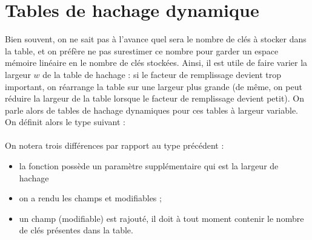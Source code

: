 \documentclass[10pt,a4paper, varwidth]{article}
\begin{document}
	\section{Tables de hachage dynamique}
	
	Bien souvent, on ne sait pas à l'avance quel sera le nombre de clés à stocker dans la table, 
    et on préfère ne pas surestimer ce nombre pour garder un espace mémoire linéaire en le nombre de clés stockées. 
    Ainsi, il est utile de faire varier la largeur $w$ de la table de hachage : si le
	facteur de remplissage devient trop important, on réarrange la table sur une largeur plus grande (de même, on
	peut réduire la largeur de la table lorsque le facteur de remplissage devient petit). On parle alors de tables de
	hachage dynamiques pour ces tables à largeur variable.\\
	On définit alors le type suivant :\\
	\\
	On notera trois différences par rapport au type précédent :
	\begin{itemize}
		\item la fonction  possède un paramètre supplémentaire qui est la largeur de hachage
		\item on a rendu les champs  et  modifiables ;
		\item un champ  (modifiable) est rajouté, il doit à tout moment contenir le nombre de clés présentes dans la table.
	\end{itemize}
\end{document}
